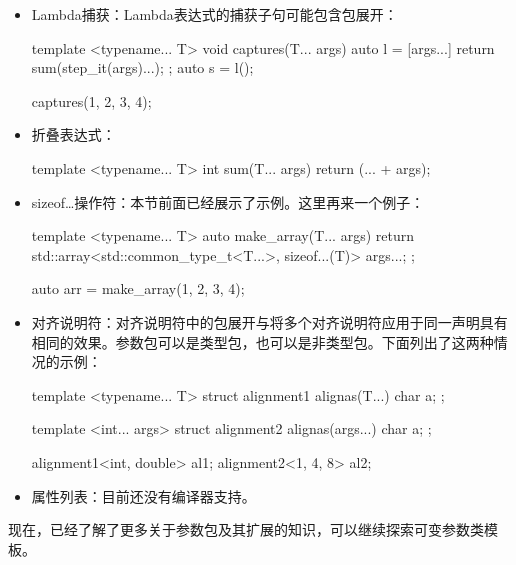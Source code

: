 \begin{itemize}
\begin{cpp}
{	using Bases::execute...;
};

A a;
B b;
C c;
X x(a, b, c);

x.A::execute();
x.B::execute();
x.C::execute();
\end{cpp}

\item
Lambda捕获：Lambda表达式的捕获子句可能包含包展开：

\begin{cpp}
template <typename... T>
void captures(T... args)
{
	auto l = [args...]{
		        return sum(step_it(args)...); };
	auto s = l();
}

captures(1, 2, 3, 4);
\end{cpp}

\item
折叠表达式：

\begin{cpp}
template <typename... T>
int sum(T... args)
{
	return (... + args);
}
\end{cpp}

\item
sizeof…操作符：本节前面已经展示了示例。这里再来一个例子：

\begin{cpp}
template <typename... T>
auto make_array(T... args)
{
	return std::array<std::common_type_t<T...>,
	                  sizeof...(T)> {args...};
};

auto arr = make_array(1, 2, 3, 4);
\end{cpp}

\item
对齐说明符：对齐说明符中的包展开与将多个对齐说明符应用于同一声明具有相同的效果。参数包可以是类型包，也可以是非类型包。下面列出了这两种情况的示例：

\begin{cpp}
template <typename... T>
struct alignment1
{
	alignas(T...) char a;
};

template <int... args>
struct alignment2
{
	alignas(args...) char a;
};

alignment1<int, double> al1;
alignment2<1, 4, 8> al2;
\end{cpp}

\item
属性列表：目前还没有编译器支持。
\end{itemize}

现在，已经了解了更多关于参数包及其扩展的知识，可以继续探索可变参数类模板。








